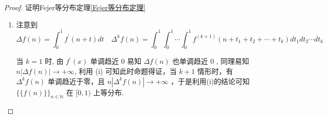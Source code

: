 \begin{proof}{证明Fejer等分布定理\cref{Fejer等分布定理}}
\begin{enumerate}
              注意到 $\Delta f(n)$ 是单调的, 利用交错相消性可知
              $$
                  \left|\frac{1}{N} \sum_{n=1}^{N-1} e^{2 \pi i h f(n)}\right| \leq \frac{1}{\pi|h|}\left(\frac{1}{N|\Delta f(1)|}+\frac{1}{N|\Delta f(N)|}\right)+\frac{\pi|h|}{N} \sum_{n=1}^{N-1}|\Delta f(n)| \xrightarrow{N \rightarrow \infty} 0
              $$

              由 Weyl准则命题得证。
              其它情形下，不妨设 $k \in \mathbb{N}$ ，当 $k+1$ 情形时满足条件，我们有
              $$
                  f(n+h)-f(n)=\sum_{j=0}^{h-1} \Delta f(n+j)
              $$

              于是有
              $$
                  \Delta^k(f(n+h)-f(n))=\sum_{j=0}^{h-1} \Delta^{k+1} f(n+j)
              $$

              由 $\Delta^{k+1} f(n)$ 的单调趋近 0 性质可知, 当 $n$ 充分大时, 于是得 $\Delta^k(f(n+h)-f(n))$ 单调趋近于 0 , 且 $n\left|\Delta^k(f(n+h)-f(n))\right| \rightarrow+\infty$ 重复以上步骤, 得 $\Delta\left(\Delta^{k-1}(f(n+h)-f(n))\right)$单调趋近于 0 , 且
              $$
                  n\left|\Delta\left(\Delta^{k-1}(f(n+h)-f(n))\right)\right| \rightarrow+\infty
              $$

              反复重复差分运算, 将差分次数由 $k+1$ 降低至 1 , 运用 Van Der Corput 差分定理\cref{Van Der Corput 差分定理}最终得 $\{\{f(n)\}\}_{n \in \mathbb{N}}$ 在 $[0,1)$ 上等分布。
        \item 注意到
              $$
                  \Delta f(n)=\int_0^1 f^{\prime}(n+t) d t \quad \Delta^k f(n)=\int_0^1 \int_0^1 \cdots \int_0^1 f^{(k+1)}\left(n+t_1+t_2+\cdots+t_k\right) d t_1 d t_2 \cdots d t_k
              $$

              当 $k=1$ 时, 由 $f^{\prime}(x)$ 单调趋近 0 易知 $\Delta f(n)$ 也单调趋近 0 , 同理易知 $n|\Delta f(n)| \rightarrow+\infty$, 利用 (i) 可知此时命题得证，当 $k+1$ 情形时，有 $\Delta^k f(n)$ 单调趋近于零，且 $n\left|\Delta^k f(n)\right| \rightarrow+\infty$ ，于是利用(i)的结论可知 $\{\{f(n)\}\}_{n \in \mathbb{N}}$ 在 $[0,1)$ 上等分布.

    \end{enumerate}
\end{proof}

